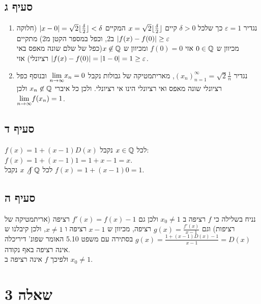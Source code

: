 \documentclass{article}
\begin{document}
	\subsection*{סעיף ג}
	\begin{enumerate}
		\item 	נגדיר $\varepsilon = 1$ כך שלכל $\delta > 0$ קיים $x=\sqrt{2}\lfloor \frac{\delta}{2} \rfloor$
		המקיים $\left| x-0 \right|= \sqrt{2}\lfloor \frac{\delta}{2} \rfloor < \delta$ (חלוקה ב2, וכפל במספר הקטן מ2)
		מתקיים $\left| f(x)-f(0) \right| \geq \varepsilon$ \\
		מכיוון ש $0 \in \mathbb{Q}$ אזי $f(0)=0$ ומכיוון ש $x \not\in \mathbb{Q}$(כפל של שלם שונה מאפס באי רציונלי) אזי
		$\left| f(x)-f(0) \right| = \left| 1-0 \right| = 1 \geq \varepsilon$.

		\item נגדיר $(x_n)^\infty_{n=1} = \sqrt{2}\frac{1}{n}$,
		מאריתמטיקה של גבולות נקבל $\displaystyle{\lim_{n \to \infty}} x_n = 0$  ובנוסף כפל רציונלי שונה מאפס ואי רציונלי הינו אי רציונלי. ולכן כל איברי $x_n \not\in \mathbb{Q}$ ולכן
		$\displaystyle{\lim_{n \to \infty}} f(x_n) = 1$.
	\end{enumerate}

	\subsection*{סעיף ד}
	$f(x) = 1 + (x-1)D(x)$ לכל $x \in \mathbb{Q}$ נקבל: $f(x) = 1 + (x-1)1 = 1 + x -1 = x$. \\
	לכל $x \not\int \mathbb{Q}$ נקבל $f(x) = 1 + (x-1)0 = 1$.

	\subsection*{סעיף ה}
	נניח בשלילה כי $f$ רציפה ב $x_0 \neq 1$ ולכן גם $f'(x)=f(x)-1$ רציפה (אריתמטיקה של רציפות)
	וגם $g(x) = \frac{f'(x)}{x-1}$ רציפה, מכיוון ש $x-1$ רציפה ו $x \neq 1$,
	ולכן קיבלנו ש $g(x) = \frac{1 + (x-1)D(x) - 1}{x-1} = D(x)$ בסתירה עם משפט 5.10
	האומר שפונ' דיריכלה אינה רציפה באף נקודה. \\
	ולפיכך $f$ אינה רציפה ב $x_0 \neq 1$.

	\section*{שאלה 3}
\end{document}
